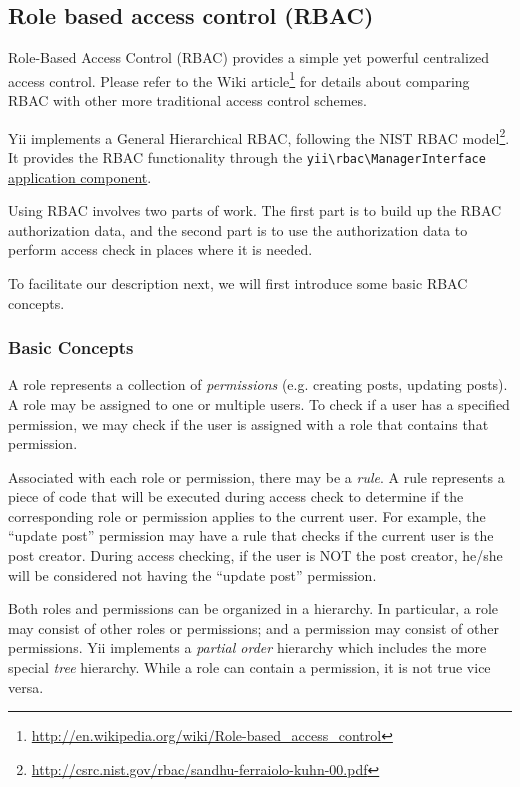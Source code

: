 \subsection{Role based access control (RBAC)}
Role-Based Access Control (RBAC) provides a simple yet powerful centralized access control. Please refer to
the Wiki article\footnote{\url{http://en.wikipedia.org/wiki/Role-based\_access\_control}} for details about comparing RBAC
with other more traditional access control schemes.

Yii implements a General Hierarchical RBAC, following the NIST RBAC model\footnote{\url{http://csrc.nist.gov/rbac/sandhu-ferraiolo-kuhn-00.pdf}}.
It provides the RBAC functionality through the \texttt{yii{\allowbreak{}\textbackslash}rbac{\allowbreak{}\textbackslash}ManagerInterface} \hyperref[structure-application-components.md]{application component}.

Using RBAC involves two parts of work. The first part is to build up the RBAC authorization data, and the second
part is to use the authorization data to perform access check in places where it is needed.

To facilitate our description next, we will first introduce some basic RBAC concepts.

\subsubsection{Basic Concepts}
A role represents a collection of \textit{permissions} (e.g. creating posts, updating posts). A role may be assigned
to one or multiple users. To check if a user has a specified permission, we may check if the user is assigned
with a role that contains that permission.

Associated with each role or permission, there may be a \textit{rule}. A rule represents a piece of code that will be
executed during access check to determine if the corresponding role or permission applies to the current user.
For example, the ``update post'' permission may have a rule that checks if the current user is the post creator.
During access checking, if the user is NOT the post creator, he/she will be considered not having the ``update post'' permission.

Both roles and permissions can be organized in a hierarchy. In particular, a role may consist of other roles or permissions;
and a permission may consist of other permissions. Yii implements a \textit{partial order} hierarchy which includes the
more special \textit{tree} hierarchy. While a role can contain a permission, it is not true vice versa.

